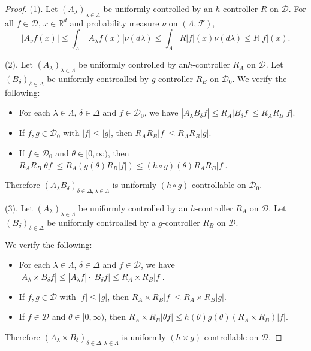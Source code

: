 \documentclass[12pt,a4paper]{amsart}
\theoremstyle{plain}
\theoremstyle{definition}
\numberwithin{equation}{section}
\begin{document}
\begin{proof}
    (1). Let $(A_\lambda)_{\lambda\in\Lambda}$ be uniformly controlled by an $h$-controller $R$ on $\mathcal D$. For all $f \in \mathcal{D}$, $x\in \mathbb R^d$ and  probability measure $\nu$ on $(\Lambda, \mathscr F)$,
\[
   |A_{\nu}f(x)|\leq \int_{\Lambda}|A_{\lambda}f(x)|\nu(d\lambda) \leq \int_{\Lambda}R|f|(x)\nu(d\lambda) \leq R|f|(x).
\]

    (2). Let $(A_\lambda)_{\lambda\in\Lambda}$ be uniformly controlled by  an$h$-controller $R_A$ on $\mathcal D$. 
    Let $(B_\delta)_{\delta\in\Delta}$ be uniformly controalled by $g$-controller $R_B$ on $\mathcal D_0$. 
    We verify the following:
\begin{itemize}
\item
    For each $\lambda \in \Lambda$, $\delta \in \Delta$ and $f\in \mathcal D_0$, we have $|A_\lambda B_\delta f| \leq R_A |B_\delta f| \leq R_A R_B |f|$.
\item
    If $f,g \in \mathcal D_0$ with $|f|\leq |g|$, then $R_AR_B|f| \leq R_A R_B |g|$.
\item
    If $f \in \mathcal D_0$ and $\theta \in [0,\infty)$, then $R_AR_B|\theta f| \leq R_A(g(\theta) R_B|f|) \leq (h\circ g)(\theta) R_A R_B |f| $.
\end{itemize}
    Therefore $(A_\lambda B_\delta)_{\delta\in \Delta, \lambda \in \Lambda}$ is uniformly $(h \circ g)$-controllable on $\mathcal D_0$.

    (3). Let $(A_\lambda)_{\lambda\in\Lambda}$ be uniformly controlled by an $h$-controller $R_A$ on $\mathcal D$. 
    Let $(B_\delta)_{\delta\in\Delta}$ be uniformly controalled by a $g$-controller $R_B$ on $\mathcal D$. 
    
    We verify the following:
\begin{itemize}
\item
    For each $\lambda \in \Lambda$, $\delta \in \Delta$ and $f\in \mathcal D$, we have $|A_\lambda \times B_\delta f| \leq |A_\lambda f| \cdot |B_\delta f| \leq R_A \times R_B |f|$.
\item
    If $f,g \in \mathcal D$ with $|f|\leq |g|$, then $R_A\times R_B|f| \leq R_A\times R_B |g|$.
\item
    If $f \in \mathcal D$ and $\theta \in [0,\infty)$, then $R_A\times R_B|\theta f| \leq h(\theta) g(\theta) (R_A \times R_B) |f| $.
\end{itemize}
    Therefore $(A_\lambda \times B_\delta)_{\delta\in \Delta, \lambda \in \Lambda}$ is uniformly $(h \times g)$-controllable on $\mathcal D$.
    

\end{proof}
\end{document}
